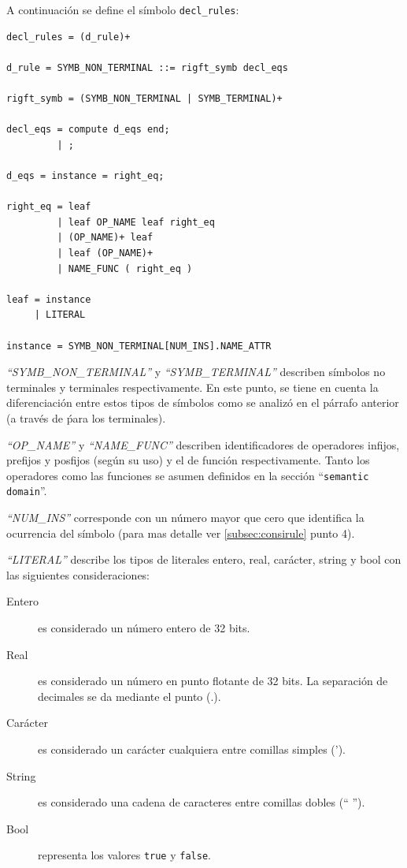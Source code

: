 A continuación se define el símbolo \texttt{decl\_rules}:

\vspace{0.3cm}
\begin{lstlisting}[frame=shadowbox, rulesepcolor=\color{azul}, language=specmag]
decl_rules = (d_rule)+ 

d_rule = SYMB_NON_TERMINAL ::= rigft_symb decl_eqs

rigft_symb = (SYMB_NON_TERMINAL | SYMB_TERMINAL)+

decl_eqs = compute d_eqs end;
         | ;

d_eqs = instance = right_eq;

right_eq = leaf
         | leaf OP_NAME leaf right_eq
         | (OP_NAME)+ leaf
         | leaf (OP_NAME)+
         | NAME_FUNC ( right_eq ) 

leaf = instance
     | LITERAL

instance = SYMB_NON_TERMINAL[NUM_INS].NAME_ATTR
\end{lstlisting}
\vspace{0.3cm}

\textit{``SYMB\_NON\_TERMINAL''} y \textit{``SYMB\_TERMINAL''} describen símbolos no terminales y terminales respectivamente. En este punto, se tiene en cuenta la diferenciación entre estos tipos de símbolos como se analizó en el párrafo anterior (a través de \' para los terminales).
 
\textit{``OP\_NAME''} y  \textit{``NAME\_FUNC''} describen identificadores de operadores infijos, prefijos y posfijos (según su uso) y el de función respectivamente. Tanto los operadores como las funciones se asumen definidos en la sección ``\texttt{semantic domain}''.

\textit{``NUM\_INS''} corresponde con un número mayor que cero que identifica la ocurrencia del símbolo (para mas detalle ver \ref{subsec:consirule} punto 4).

\textit{``LITERAL''} describe los tipos de literales entero, real, carácter, string y bool con las siguientes consideraciones:

\begin{description}
\item [Entero] es considerado un número entero de 32 bits. 
\item [Real] es considerado un número en punto flotante de 32 bits. La separación de decimales se da mediante el punto (.).
\item [Carácter] es considerado un carácter cualquiera entre comillas simples (').
\item [String] es considerado una cadena de caracteres entre comillas dobles (`` '').
\item [Bool] representa los valores \texttt{true} y \texttt{false}.
\end{description}


